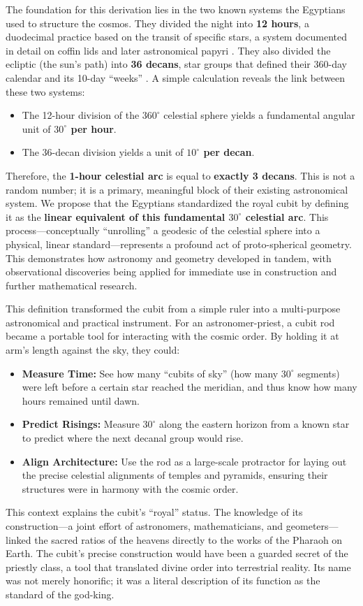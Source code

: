 \documentclass[11pt]{article}
\begin{document}
The foundation for this derivation lies in the two known systems the Egyptians used to structure the cosmos. They divided the night into \textbf{12 hours}, a duodecimal practice based on the transit of specific stars, a system documented in detail on coffin lids and later astronomical papyri \cite{clagett1995ancient}. They also divided the ecliptic (the sun's path) into \textbf{36 decans}, star groups that defined their 360-day calendar and its 10-day ``weeks'' \cite{parker1950calendars, neugebauer1969exact}. A simple calculation reveals the link between these two systems:
\begin{itemize}
    \item The 12-hour division of the $360^\circ$ celestial sphere yields a fundamental angular unit of \textbf{$30^\circ$ per hour}.
    \item The 36-decan division yields a unit of \textbf{$10^\circ$ per decan}.
\end{itemize}
Therefore, the \textbf{1-hour celestial arc} is equal to \textbf{exactly 3 decans}. This is not a random number; it is a primary, meaningful block of their existing astronomical system. We propose that the Egyptians standardized the royal cubit by defining it as the \textbf{linear equivalent of this fundamental $30^\circ$ celestial arc}. This process—conceptually ``unrolling'' a geodesic of the celestial sphere into a physical, linear standard—represents a profound act of proto-spherical geometry. This demonstrates how astronomy and geometry developed in tandem, with observational discoveries being applied for immediate use in construction and further mathematical research.

This definition transformed the cubit from a simple ruler into a multi-purpose astronomical and practical instrument. For an astronomer-priest, a cubit rod became a portable tool for interacting with the cosmic order. By holding it at arm's length against the sky, they could:
\begin{itemize}
    \item \textbf{Measure Time:} See how many ``cubits of sky'' (how many $30^\circ$ segments) were left before a certain star reached the meridian, and thus know how many hours remained until dawn.
    \item \textbf{Predict Risings:} Measure $30^\circ$ along the eastern horizon from a known star to predict where the next decanal group would rise.
    \item \textbf{Align Architecture:} Use the rod as a large-scale protractor for laying out the precise celestial alignments of temples and pyramids, ensuring their structures were in harmony with the cosmic order.
\end{itemize}
This context explains the cubit's ``royal'' status. The knowledge of its construction—a joint effort of astronomers, mathematicians, and geometers—linked the sacred ratios of the heavens directly to the works of the Pharaoh on Earth. The cubit's precise construction would have been a guarded secret of the priestly class, a tool that translated divine order into terrestrial reality. Its name was not merely honorific; it was a literal description of its function as the standard of the god-king.
\end{document}
